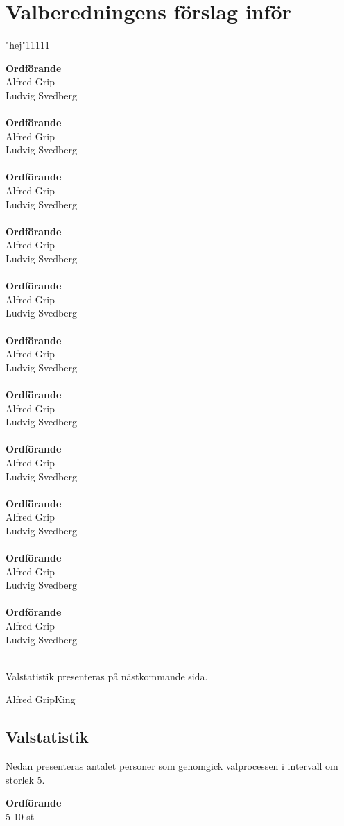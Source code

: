 \documentclass{dsekdoc}
\begin{document}
\newcommand{\WHATWHO}[2]{\textbf{#1}\\#2\\\\}


\section*{Valberedningens förslag inför \usemeeting}

"hej"11111

\begin{multicols}{2}
    \WHATWHO{Ordförande}{Alfred Grip\\ Ludvig Svedberg}
    \WHATWHO{Ordförande}{Alfred Grip\\ Ludvig Svedberg}
    \WHATWHO{Ordförande}{Alfred Grip\\ Ludvig Svedberg}
    \WHATWHO{Ordförande}{Alfred Grip\\ Ludvig Svedberg}
    \WHATWHO{Ordförande}{Alfred Grip\\ Ludvig Svedberg}
    \WHATWHO{Ordförande}{Alfred Grip\\ Ludvig Svedberg}
    \WHATWHO{Ordförande}{Alfred Grip\\ Ludvig Svedberg}
    \WHATWHO{Ordförande}{Alfred Grip\\ Ludvig Svedberg}
    \WHATWHO{Ordförande}{Alfred Grip\\ Ludvig Svedberg}
    \WHATWHO{Ordförande}{Alfred Grip\\ Ludvig Svedberg}
    \WHATWHO{Ordförande}{Alfred Grip\\ Ludvig Svedberg}

\end{multicols}

\medskip

Valstatistik presenteras på nästkommande sida.\newline

\signature{För Valberedningen}{Alfred Grip}{King}

\newpage
\subsection*{Valstatistik}
Nedan presenteras antalet personer som genomgick valprocessen i intervall om storlek 5.

\begin{multicols}{2}
\WHATWHO{Ordförande}{5-10 st}

\end{multicols}
\end{document}
